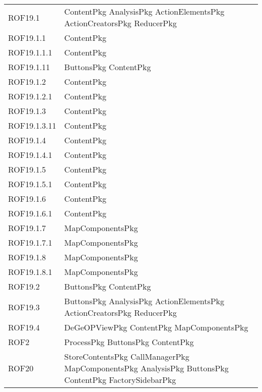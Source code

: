 \begin{longtable}{p{2.5cm}!{\VRule[1pt]}p{5cm}}
		ROF19.1 & ContentPkg \newline AnalysisPkg \newline ActionElementsPkg \newline ActionCreatorsPkg \newline ReducerPkg\\
		ROF19.1.1 & ContentPkg\\
		ROF19.1.1.1 & ContentPkg\\
		ROF19.1.11 & ButtonsPkg \newline ContentPkg\\
		ROF19.1.2 & ContentPkg\\
		ROF19.1.2.1 & ContentPkg\\
		ROF19.1.3 & ContentPkg\\
		ROF19.1.3.11 & ContentPkg\\
		ROF19.1.4 & ContentPkg\\
		ROF19.1.4.1 & ContentPkg\\
		ROF19.1.5 & ContentPkg\\
		ROF19.1.5.1 & ContentPkg\\
		ROF19.1.6 & ContentPkg\\
		ROF19.1.6.1 & ContentPkg\\
		ROF19.1.7 & MapComponentsPkg\\
		ROF19.1.7.1 & MapComponentsPkg\\
		ROF19.1.8 & MapComponentsPkg\\
		ROF19.1.8.1 & MapComponentsPkg\\
		ROF19.2 & ButtonsPkg \newline ContentPkg\\
		ROF19.3 & ButtonsPkg \newline AnalysisPkg \newline ActionElementsPkg \newline ActionCreatorsPkg \newline ReducerPkg\\
		ROF19.4 & DeGeOPViewPkg \newline ContentPkg \newline MapComponentsPkg\\
		ROF2 & ProcessPkg \newline ButtonsPkg \newline ContentPkg\\
		ROF20 & StoreContentsPkg \newline CallManagerPkg \newline MapComponentsPkg \newline AnalysisPkg \newline ButtonsPkg \newline ContentPkg \newline FactorySidebarPkg\\

\end{longtable}
